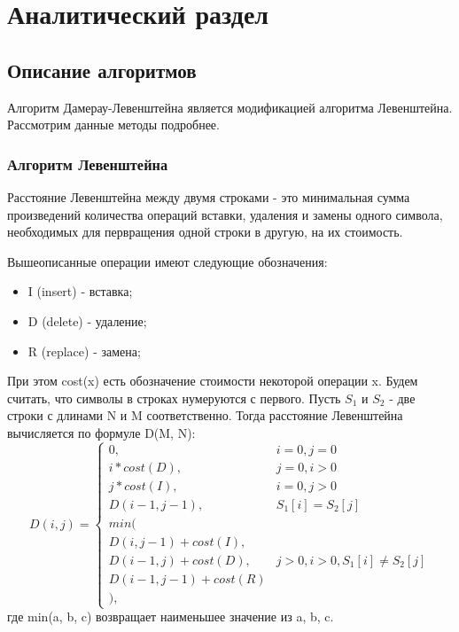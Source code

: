 \chapter{Аналитический раздел}
\label{cha:analysis}

\section{Описание алгоритмов}

Алгоритм Дамерау-Левенштейна является модификацией алгоритма Левенштейна. Рассмотрим данные методы подробнее.

\subsection{Алгоритм Левенштейна}

Расстояние Левенштейна между двумя строками - это минимальная сумма произведений количества операций вставки, удаления и замены одного символа, необходимых для первращения одной строки в другую, на их стоимость.

Вышеописанные операции имеют следующие обозначения:
\begin{itemize}
    \item I (insert) - вставка;
    \item D (delete) - удаление;
    \item R (replace) - замена;
\end{itemize}

При этом cost(x) есть обозначение стоимости некоторой операции x. Будем считать, что символы в строках нумеруются с первого. Пусть $S_{1}$ и $S_{2}$ - две строки с длинами N и M соответственно. Тогда расстояние Левенштейна вычисляется по формуле D(M, N):
\begin{displaymath}
D(i,j) = \left\{ \begin{array}{ll}
 0, & \textrm{$i = 0, j = 0$}\\
 i * cost(D), & \textrm{$j = 0, i > 0$}\\
 j * cost(I), & \textrm{$i = 0, j > 0$}\\
 D(i - 1, j - 1), & \textrm{$S_{1}[i] = S_{2}[j]$}\\
min(\\
D(i,j-1) + cost(I),\\
D(i-1, j) + cost(D), &\textrm{$j > 0, i > 0, S_1[i] \neq S_2[j]$}\\
D(i-1, j-1) + cost(R)\\
),
  \end{array} \right.
\end{displaymath}
где min(a, b, c) возвращает наименьшее значение из a, b, c.

